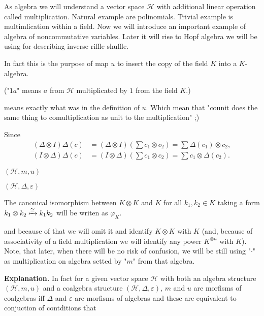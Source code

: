 \documentclass[a4paper]{article}
\begin{document}
As algebra we will understand a vector space $\mathcal{H}$ with additional linear operation
 called multiplication.
Natural example are polinomials. Trivial example is multimlication within a field.
Now we will introduce an important example of algebra of noncommutative variables. Later it will rise
to Hopf algebra we will be using for describing inverse riffle shuffle.



In fact this is the purpose of map $u$ to insert the copy of the field $K$ into a $K$-algebra.

("$1a$" means $a$ from $\mathcal{H}$ multiplicated by $1$ from the field $K$.)


means exactly what was in the definition of $u$.
Which mean that "counit does the same thing to comultiplication as unit to the multiplication" ;)

Since
\begin{align*}
(\Delta \otimes I)\Delta(c) &= (\Delta \otimes I)\left(\sum c_1 \otimes c_2 \right) =
\sum\Delta(c_1) \otimes c_2, \\
(I \otimes \Delta)\Delta(c) &= (I \otimes \Delta)\left(\sum c_1 \otimes c_2 \right) =
\sum c_1 \otimes \Delta(c_2).
\end{align*}


$(\mathcal{H}, m, u)$

$(\mathcal{H}, \Delta, \varepsilon)$


    The canonical isomorphism between $K \otimes K$ and $K$ for all
$k_1, k_2 \in K$ taking a form $k_1 \otimes k_2 \xmapsto{\cong} k_1k_2$ will be writen as $\varphi_K$.

 and because of that we will omit it and identify $K \otimes K$ with $K$
(and, because of associativity of a field multiplication we will identify any power $K^{\otimes n}$ with $K$).
\\[8pt]

Note, that later, when there will be no risk of confusion,
we will be still using "$\cdot$" as multiplication on algebra setted by "$m$" from that algebra.

\textbf{Explanation. } In fact for a given vector space $\mathcal{H}$ with both an algebra structure
$(\mathcal{H}, m, u)$ and a coalgebra structure $(\mathcal{H}, \Delta, \varepsilon)$, $m$ and $u$
are morfisms of coalgebras iff $\Delta$ and $\varepsilon$ are morfisms of algebras and these are equivalent
to conjuction of contditions that
\end{document}
